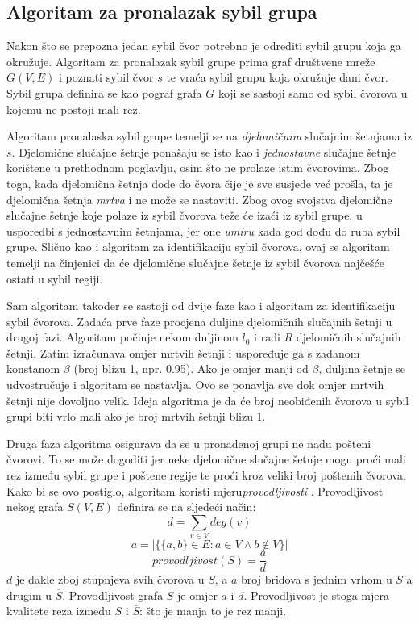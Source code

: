 \documentclass[times, utf8, seminar, numeric]{fer}
\begin{document}
\subsection{Algoritam za pronalazak sybil grupa}
Nakon što se prepozna jedan sybil čvor potrebno je odrediti sybil grupu koja ga okružuje. Algoritam za pronalazak sybil grupe prima graf društvene mreže $G(V, E)$ i poznati sybil čvor $s$ te vraća sybil grupu koja okružuje dani čvor. Sybil grupa definira se kao pograf grafa $G$ koji se sastoji samo od sybil čvorova u kojemu ne postoji mali rez.

Algoritam pronalaska sybil grupe temelji se na \textit{djelomičnim} slučajnim šetnjama iz $s$. Djelomične slučajne šetnje ponašaju se isto kao i \textit{jednostavne} slučajne šetnje korištene u prethodnom poglavlju, osim što ne prolaze istim čvorovima. Zbog toga, kada djelomična šetnja dođe do čvora čije je sve susjede već prošla, ta je djelomična šetnja \textit{mrtva} i ne može se nastaviti. Zbog ovog svojstva djelomične slučajne šetnje koje polaze iz sybil čvorova teže će izaći iz sybil grupe, u usporedbi s jednostavnim šetnjama, jer one \textit{umiru} kada god dođu do ruba sybil grupe. Slično kao i algoritam za identifikaciju sybil čvorova, ovaj se algoritam temelji na činjenici da će djelomične slučajne šetnje iz sybil čvorova najčešće ostati u sybil regiji.

Sam algoritam također se sastoji od dvije faze kao i algoritam za identifikaciju sybil čvorova. Zadaća prve faze procjena duljine djelomičnih slučajnih šetnji u drugoj fazi. Algoritam počinje nekom duljinom $l_0$ i radi $R$ djelomičnih slučajnih šetnji. Zatim izračunava omjer mrtvih šetnji i uspoređuje ga s zadanom konstanom $\beta$ (broj blizu 1, npr. 0.95). Ako je omjer manji od $\beta$, duljina šetnje se udvostručuje i algoritam se nastavlja. Ovo se ponavlja sve dok omjer mrtvih šetnji nije dovoljno velik. Ideja algoritma je da će broj neobiđenih čvorova u sybil grupi biti vrlo mali ako je broj mrtvih šetnji blizu 1.

Druga faza algoritma osigurava da se u pronađenoj grupi ne nađu pošteni čvorovi. To se može dogoditi jer neke djelomične slučajne šetnje mogu proći mali rez između sybil grupe i poštene regije te proći kroz veliki broj poštenih čvorova. Kako bi se ovo postiglo, algoritam koristi mjeru\textit{provodljivosti} . Provodljivost nekog grafa $S(V, E)$ definira se na sljedeći način:
\[ d = \sum_{v \in V} deg(v) \]
\[ a = |\{\{a, b\} \in E : a \in V \land b \notin V\}| \]
\[ provodljivost(S) = \frac{a}{d} \]
$d$ je dakle zboj stupnjeva svih čvorova u $S$, a $a$ broj bridova s jednim vrhom u $S$ a drugim u $\overline{S}$. Provodljivost grafa $S$ je omjer $a$ i $d$. Provodljivost je stoga mjera kvalitete reza između $S$ i $\overline{S}$: što je manja to je rez manji.
\end{document}
